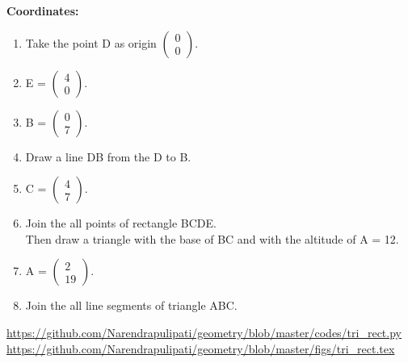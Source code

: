 \begin{frame}{}
\textbf{Coordinates:}
\begin{enumerate}
\item Take the point D as origin $\begin{pmatrix} 0\\0 \end{pmatrix}.$
\item E = $\begin{pmatrix} 4\\0 \end{pmatrix}.$
\item B = $\begin{pmatrix} 0\\7 \end{pmatrix}.$
\item Draw a line DB from the D to B.
\item C = $\begin{pmatrix} 4\\7 \end{pmatrix}.$
\item Join the all points of rectangle BCDE.\\
Then draw a triangle with the base of BC and with the altitude of A = 12.\\
\item A = $\begin{pmatrix} 2\\19 \end{pmatrix}.$
\item Join the all line segments of triangle ABC.  
\end{enumerate}
\end{frame}
\begin{frame}
\url{https://github.com/Narendrapulipati/geometry/blob/master/codes/tri_rect.py}
\url{https://github.com/Narendrapulipati/geometry/blob/master/figs/tri_rect.tex}
\end{frame}